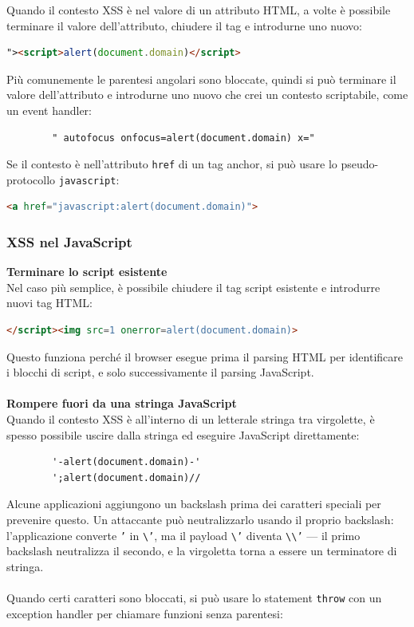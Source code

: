 \documentclass[12pt,a4paper]{report}
\begin{document}
	Quando il contesto XSS è nel valore di un attributo HTML, a volte è possibile terminare il valore dell'attributo, chiudere il tag e introdurne uno nuovo:
	
	\begin{lstlisting}[language=HTML]
		"><script>alert(document.domain)</script>
	\end{lstlisting}
	
	Più comunemente le parentesi angolari sono bloccate, quindi si può terminare il valore dell'attributo e introdurne uno nuovo che crei un contesto scriptabile, come un event handler:
	
	\begin{lstlisting}
		" autofocus onfocus=alert(document.domain) x="
	\end{lstlisting}
	
	Se il contesto è nell'attributo \texttt{href} di un tag anchor, si può usare lo pseudo-protocollo \texttt{javascript}:
	
	\begin{lstlisting}[language=HTML]
		<a href="javascript:alert(document.domain)">
	\end{lstlisting}
	
	\subsubsection{XSS nel JavaScript}
	
	\textbf{Terminare lo script esistente}\\
	Nel caso più semplice, è possibile chiudere il tag script esistente e introdurre nuovi tag HTML:
	
	\begin{lstlisting}[language=HTML]
		</script><img src=1 onerror=alert(document.domain)>
	\end{lstlisting}
	
	Questo funziona perché il browser esegue prima il parsing HTML per identificare i blocchi di script, e solo successivamente il parsing JavaScript.\\\\	
	\textbf{Rompere fuori da una stringa JavaScript}\\
	Quando il contesto XSS è all'interno di un letterale stringa tra virgolette, è spesso possibile uscire dalla stringa ed eseguire JavaScript direttamente:
	
	\begin{lstlisting}
		'-alert(document.domain)-'
		';alert(document.domain)//
	\end{lstlisting}
	Alcune applicazioni aggiungono un backslash prima dei caratteri speciali per prevenire questo. Un attaccante può neutralizzarlo usando il proprio backslash: l'applicazione converte \texttt{'} in \texttt{\textbackslash'}, ma il payload \texttt{\textbackslash'} diventa \texttt{\textbackslash\textbackslash'} — il primo backslash neutralizza il secondo, e la virgoletta torna a essere un terminatore di stringa.\\\\
	Quando certi caratteri sono bloccati, si può usare lo statement \texttt{throw} con un exception handler per chiamare funzioni senza parentesi:
	
\end{document}
